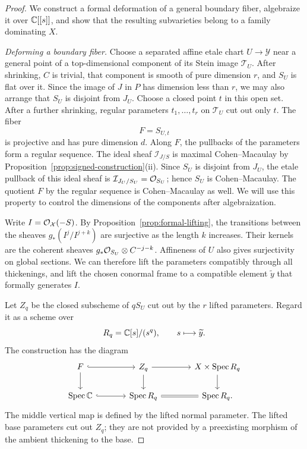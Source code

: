 \begin{proof}
We construct a formal deformation of a general boundary fiber,
algebraize it over $\mathbb{C}[[s]]$, and show that the resulting
subvarieties belong to a family dominating $X$.

\smallskip\noindent\emph{Deforming a boundary fiber.}
Choose a separated affine etale chart $U\to\mathcal Y$
near a general point of a top-dimensional component of its
Stein image $\mathcal T_U$.  After shrinking, $C$ is trivial,
that component is smooth of pure dimension $r$, and $S_U$
is flat over it.  Since the image of $J$ in $P$ has dimension
less than $r$, we may also arrange that $S_U$ is disjoint
from $J_U$.  Choose a closed point $t$ in this open set.
After a further shrinking, regular parameters
$t_1,\ldots,t_r$ on $\mathcal T_U$ cut out only $t$.
The fiber
\[
 F=S_{U,t}
\]
is projective and has pure dimension $d$.  Along $F$, the
pullbacks of the parameters form a regular sequence.  The ideal
sheaf $\mathcal I_{J/S}$ is maximal Cohen--Macaulay by
Proposition~\ref{prop:signed-construction}(ii).  Since $S_U$ is
disjoint from $J_U$, the etale pullback of this ideal sheaf is
$\mathcal I_{J_U/S_U}=\mathcal{O}_{S_U}$; hence $S_U$ is
Cohen--Macaulay.  The quotient $F$ by the regular sequence is
Cohen--Macaulay as well.  We will use this property to control
the dimensions of the components after algebraization.

Write $I=\mathcal{O}_{\mathcal X}(-S)$.  By
Proposition~\ref{prop:formal-lifting}, the transitions between
the sheaves $g_*(I^j/I^{j+k})$ are surjective as the length
$k$ increases.  Their kernels are the coherent sheaves
$g_*\mathcal{O}_{S_U}\otimes C^{-j-k}$.  Affineness of $U$ also gives
surjectivity on global sections.  We can therefore lift the
parameters compatibly through all thickenings, and lift the
chosen conormal frame to a compatible element $\widetilde y$
that formally generates $I$.

Let $Z_q$ be the closed subscheme of $qS_U$ cut out by the
$r$ lifted parameters.  Regard it as a scheme over
\[
 R_q=\mathbb{C}[s]/(s^q),\qquad s\longmapsto\widetilde y.
\]
The construction has the diagram
\[
\begin{tikzcd}[column sep=large]
F \arrow[r,hook] \arrow[d] & Z_q \arrow[r] \arrow[d] &
X\times\Spec R_q \arrow[d] \\
\Spec\C \arrow[r,hook] & \Spec R_q \arrow[r,equal] & \Spec R_q.
\end{tikzcd}
\]
The middle vertical map is defined by the lifted normal parameter.
The lifted base parameters cut out $Z_q$; they are not provided by a
preexisting morphism of the ambient thickening to the base.


\end{proof}
